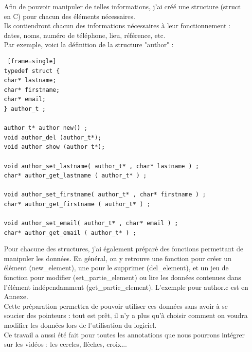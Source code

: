 \documentclass[11pt,french,a4paper]{report}
\begin{document}
Afin de pouvoir manipuler de telles informations, j'ai créé une structure (struct en C) pour chacun des éléments nécessaires. \\
Ils contiendront chacun des informations nécessaires à leur fonctionnement : dates, noms, numéro de téléphone, lieu, référence, etc. \\

Par exemple, voici la définition de la structure "author" : 
\begin{lstlisting} [frame=single]
typedef struct {
char* lastname;
char* firstname;
char* email;
} author_t ;

author_t* author_new() ;
void author_del (author_t*);
void author_show (author_t*);

void author_set_lastname( author_t* , char* lastname ) ;
char* author_get_lastname ( author_t* ) ;

void author_set_firstname( author_t* , char* firstname ) ;
char* author_get_firstname ( author_t* ) ;

void author_set_email( author_t* , char* email ) ;
char* author_get_email ( author_t* ) ;
\end{lstlisting}

Pour chacune des structures, j'ai également préparé des fonctions permettant de manipuler les données.
En général, on y retrouve une fonction pour créer un élément (new\_element), une pour le supprimer (del\_element),
et un jeu de fonction pour modifier (set\_partie\_element) ou lire les données contenues dans l'élément indépendamment 
(get\_partie\_element). L'exemple pour author.c est en Annexe.\\

Cette préparation permettra de pouvoir utiliser ces données sans avoir à se soucier des pointeurs : tout est prêt, il n'y
a plus qu'à choisir comment on voudra modifier les données lors de l'utilisation du logiciel. \\

Ce travail a aussi été fait pour toutes les annotations que nous pourrons intégrer sur les vidéos : 
les cercles, flèches, croix... \\
\end{document}
